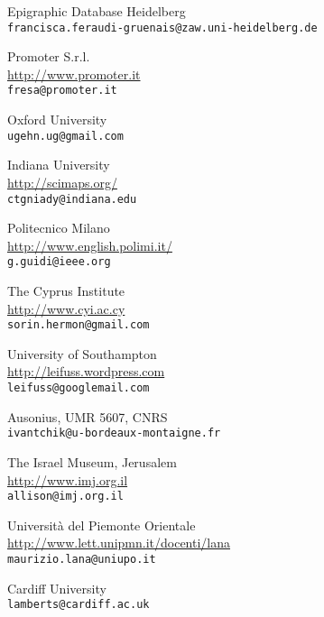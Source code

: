 \begin{contributors}
{ Epigraphic Database Heidelberg	  \\
\texttt{francisca.feraudi-gruenais@zaw.uni-heidelberg.de	}
}
		

{  	Promoter S.r.l. \\
\url{http://www.promoter.it} \\
\texttt{fresa@promoter.it}
}


{ Oxford University	  \\
\texttt{ugehn.ug@gmail.com}
}
	

{ Indiana University  \\
\url{	http://scimaps.org/}	\\
\texttt{ctgniady@indiana.edu}
}
	


{  Politecnico Milano \\
\url{http://www.english.polimi.it/ }\\
\texttt{g.guidi@ieee.org}
}

{  The Cyprus Institute	 \\
\url{http://www.cyi.ac.cy} \\
\texttt{sorin.hermon@gmail.com}
}

	

{  University of Southampton	 \\
\url{http://leifuss.wordpress.com} \\
\texttt{leifuss@googlemail.com	}
}

{  Ausonius, UMR 5607, CNRS	 \\
\texttt{ivantchik@u-bordeaux-montaigne.fr}
}

	
	
{ The Israel Museum, Jerusalem	  \\
\url{http://www.imj.org.il} \\
\texttt{allison@imj.org.il}
}
			
			
{  Università del Piemonte Orientale	 \\
\url{http://www.lett.unipmn.it/docenti/lana}	 \\
\texttt{maurizio.lana@uniupo.it}
}
			
{   Cardiff University\\
\texttt{lamberts@cardiff.ac.uk}
}



\end{contributors}
